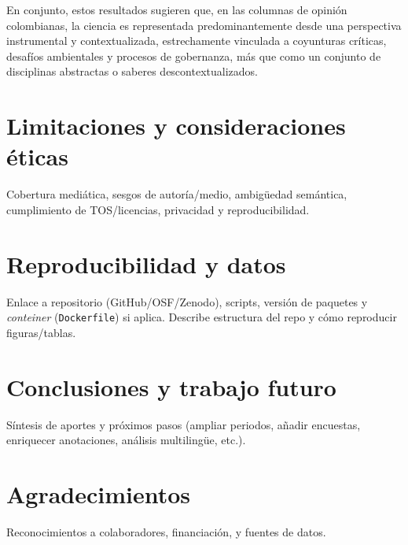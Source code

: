 \documentclass[11pt,a4paper]{article}
\begin{document}
En conjunto, estos resultados sugieren que, en las columnas de opinión colombianas, la ciencia es representada predominantemente desde una perspectiva instrumental y contextualizada, estrechamente vinculada a coyunturas críticas, desafíos ambientales y procesos de gobernanza, más que como un conjunto de disciplinas abstractas o saberes descontextualizados.
	
	
	\section{Limitaciones y consideraciones éticas}
	Cobertura mediática, sesgos de autoría/medio, ambigüedad semántica, cumplimiento de TOS/licencias, privacidad y reproducibilidad.
	
	\section{Reproducibilidad y datos}
	Enlace a repositorio (GitHub/OSF/Zenodo), scripts, versión de paquetes y \emph{conteiner} (\texttt{Dockerfile}) si aplica. 
	Describe estructura del repo y cómo reproducir figuras/tablas.
	
	\section{Conclusiones y trabajo futuro}
	Síntesis de aportes y próximos pasos (ampliar periodos, añadir encuestas, enriquecer anotaciones, análisis multilingüe, etc.).
	
	\section*{Agradecimientos}
	Reconocimientos a colaboradores, financiación, y fuentes de datos.
	
	

	
	
	\appendix

	
\end{document}
